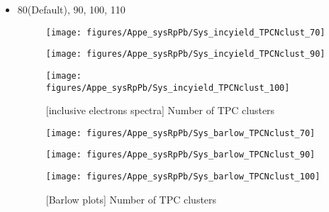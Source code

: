  \begin{itemize}
      \item 80(Default), 90, 100, 110
      
            \begin{figure}[H]
      	\begin{minipage}{0.33\hsize} 
      	\begin{center}
      	\texttt{[image: figures/Appe\_sysRpPb/Sys\_incyield\_TPCNclust\_70]}
      	\end{center}
      	\end{minipage}
      	\begin{minipage}{0.33\hsize} 
      	\begin{center}
      	\texttt{[image: figures/Appe\_sysRpPb/Sys\_incyield\_TPCNclust\_90]}
      	\end{center}
      	\end{minipage}
      	\begin{minipage}{0.33\hsize} 
      	\begin{center}
      	\texttt{[image: figures/Appe\_sysRpPb/Sys\_incyield\_TPCNclust\_100]}
      	\end{center}
      	\end{minipage}
      \caption{[inclusive electrons spectra] Number of TPC clusters}
      \label{fig:Sys_TPCNclust}
      \end{figure}
      
      \begin{figure}[H]
      	\begin{minipage}{0.33\hsize} 
      	\begin{center}
      	\texttt{[image: figures/Appe\_sysRpPb/Sys\_barlow\_TPCNclust\_70]}
      	\end{center}
      	\end{minipage}
      	\begin{minipage}{0.33\hsize} 
      	\begin{center}
      	\texttt{[image: figures/Appe\_sysRpPb/Sys\_barlow\_TPCNclust\_90]}
      	\end{center}
      	\end{minipage}
      	\begin{minipage}{0.33\hsize} 
      	\begin{center}
      	\texttt{[image: figures/Appe\_sysRpPb/Sys\_barlow\_TPCNclust\_100]}
      	\end{center}
      	\end{minipage}
      \caption{[Barlow plots] Number of TPC clusters}
      \label{fig:Sys_TPCNclust}
      \end{figure}
      
 \end{itemize}
 
